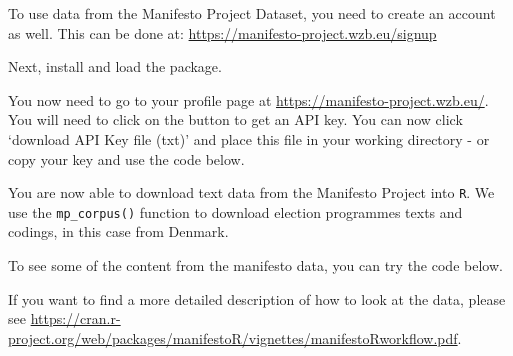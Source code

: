 \documentclass[12pt,oneside]{reedthesis}
\theoremstyle{definition}
\theoremstyle{definition}
\theoremstyle{definition}
\theoremstyle{remark}
\begin{document}
  To use data from the Manifesto Project Dataset, you need to create an
  account as well. This can be done at:
  \url{https://manifesto-project.wzb.eu/signup}
  
  Next, install and load the package.
  \begin{Shaded}
  \begin{Highlighting}[]
  \NormalTok{(}\NormalTok{)}
  
  \NormalTok{(}\NormalTok{)}
  \end{Highlighting}
  \end{Shaded}
  You now need to go to your profile page at
  \url{https://manifesto-project.wzb.eu/}. You will need to click on the
  button to get an API key. You can now click `download API Key file
  (txt)' and place this file in your working directory - or copy your key
  and use the code below.
  \begin{Shaded}
  \begin{Highlighting}[]
  \NormalTok{(} \NormalTok{)}
  \end{Highlighting}
  \end{Shaded}
  You are now able to download text data from the Manifesto Project into
  \texttt{R}. We use the \texttt{mp\_corpus()} function to download
  election programmes texts and codings, in this case from Denmark.
  \begin{Shaded}
  \begin{Highlighting}[]
  \StringTok{ }\OperatorTok{==}\NormalTok{)}
  \end{Highlighting}
  \end{Shaded}
  To see some of the content from the manifesto data, you can try the code
  below.
  \begin{Shaded}
  \begin{Highlighting}[]
  \NormalTok{(}\NormalTok{(manifesto_dk[[}\NormalTok{]]))}
  \end{Highlighting}
  \end{Shaded}
  If you want to find a more detailed description of how to look at the
  data, please see
  \url{https://cran.r-project.org/web/packages/manifestoR/vignettes/manifestoRworkflow.pdf}.
  
\end{document}
